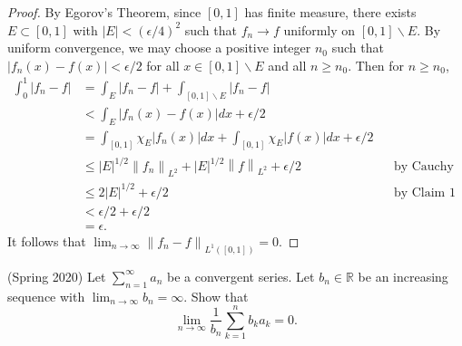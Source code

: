 \documentclass[answers]{exam}
\theoremstyle{problemstyle}
\newcommand{\norm}[1]{\left\lVert#1\right\rVert} %
\newcommand{\1}[1]{\textbf{1}_{\left[#1\right]}} %
\def\limn{\lim_{n\to\infty}} %
\def\R{\mathbb{R}} %
\begin{document}
\begin{questions}
\begin{solution}
\begin{proof}
  By Egorov's Theorem, since $[0,1]$ has finite measure, there exists $E\subset [0,1]$ with $|E|<(\epsilon/4)^{2}$ such that $f_{n}\to f$ uniformly on $[0,1]\backslash E$. By uniform convergence, we may choose a positive integer $n_{0}$ such that $\left| f_{n}(x)-f(x) \right|< \epsilon/2$ for all $x\in [0,1]\backslash E$ and all $n\geq n_{0}$. Then for $n\geq n_{0}$,
  \begin{align*}
    \int_{0}^{1}\left| f_{n}-f \right|
    &= \int_{E} |f_{n}-f| + \int_{[0,1]\backslash E} |f_{n}-f|\\
    &< \int_{E} |f_{n}(x)-f(x)|dx + \epsilon/2\\
    &= \int_{[0,1]} \chi_{E}|f_{n}(x)|dx  + \int_{[0,1]}\chi_{E}|f(x)|dx + \epsilon/2 \\
    &\leq |E|^{1/2}\norm{f_{n}}_{L^{2}}+ |E|^{1/2}\norm{f}_{L^{2}} + \epsilon/2 &&\text{by Cauchy Schwarz}\\
    &\leq 2 |E|^{1/2}+ \epsilon/2 &&\text{by Claim 1}\\
    &< \epsilon/2+\epsilon/2\\
    &=\epsilon.
  \end{align*}
  It follows that $\limn \norm{f_{n}-f}_{L^{1}([0,1])}=0$.
\end{proof}
\end{solution}


\question (Spring 2020)
Let $\sum_{n=1}^{\infty}a_{n}$ be a convergent series. Let $b_{n}\in\R$ be an increasing sequence with $\lim_{n\to\infty}b_{n}=\infty$. Show that
\begin{equation*}
  \lim_{n\to\infty} \frac{1}{b_{n}}\sum_{k=1}^{n}b_{k}a_{k} = 0.
\end{equation*}


\end{questions}
\end{document}
